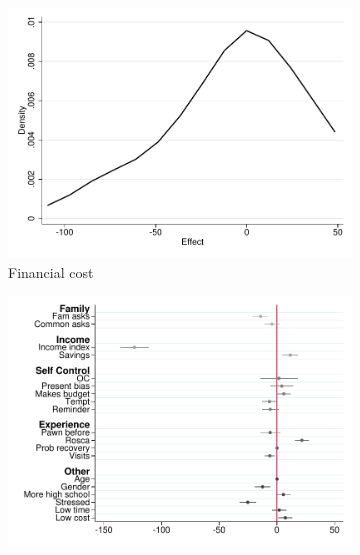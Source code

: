 \documentclass[11pt]{article}
\begin{document}
\begin{figure}[H]
    \caption{Heterogeneous Treatment Effect - Choice/Promise}
    \label{heterogeneous_te_5}
    \begin{center}
    \begin{subfigure}{0.4\textwidth}
        \caption{Financial cost}
        \centering
        \includegraphics[width=\textwidth]{Figuras/he_dist_fc_admin_disc_pro_5.pdf}
    \end{subfigure}
    \begin{subfigure}{0.4\textwidth}
        \caption*{}
        \centering
        \includegraphics[width=\textwidth]{Figuras/HE/he_int_vertical_fc_admin_disc_pro_5.pdf}
    \end{subfigure}
    

\end{center}
\end{figure}
\end{document}
